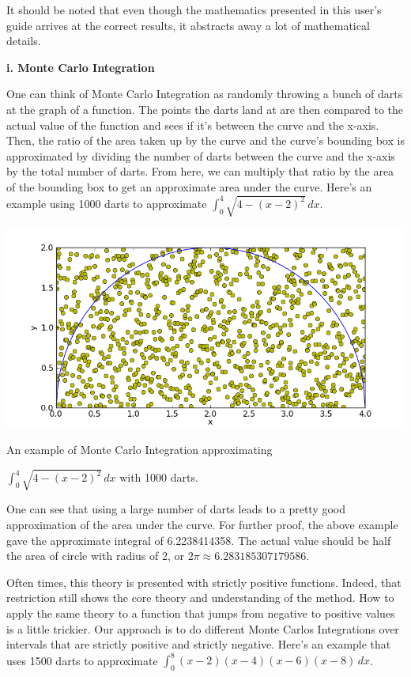 \documentclass[12pt]{article}
\newcommand{\newLine}{\vspace{5mm}}
\newcommand{\nextsubsection}[1]{\newLine \noindent \large \textbf{#1} \normalsize}
\newcommand{\integral}[3]{\text{$\int^{#2}_{#1} #3\,dx$}}
\begin{document}
It should be noted that even though the mathematics presented in this user's guide arrives at the correct results, it abstracts away a lot of mathematical details.

\nextsubsection{i. Monte Carlo Integration}

\newLine One can think of Monte Carlo Integration as randomly throwing a bunch of darts at the graph of a function. The points the darts land at are then compared to the actual value of the function and sees if it's between the curve and the x-axis. Then, the ratio of the area taken up by the curve and the curve's bounding box is approximated by dividing the number of darts between the curve and the x-axis by the total number of darts. From here, we can multiply that ratio by the area of the bounding box to get an approximate area under the curve. Here's an example using 1000 darts to approximate $\integral{0}{4}{\sqrt{4 - (x - 2)^2}}$.


\begin{center}
\includegraphics[scale=0.5]{semiCircleMonteCarlo.png}

\small An example of Monte Carlo Integration approximating 

$\integral{0}{4}{\sqrt{4 - (x - 2)^2}}$ with 1000 darts. \normalsize
\end{center}

One can see that using a large number of darts leads to a pretty good approximation of the area under the curve. For further proof, the above example gave the approximate integral of 6.2238414358. The actual value should be half the area of circle with radius of 2, or $2\pi \approx 6.283185307179586$.

Often times, this theory is presented with strictly positive functions. Indeed, that restriction still shows the core theory and understanding of the method. How to apply the same theory to a function that jumps from negative to positive values is a little trickier. Our approach is to do different Monte Carlos Integrations over intervals that are strictly positive and strictly negative. Here's an example that uses 1500 darts to approximate $\integral{0}{8}{(x-2)(x-4)(x-6)(x-8)}$.
\end{document}
